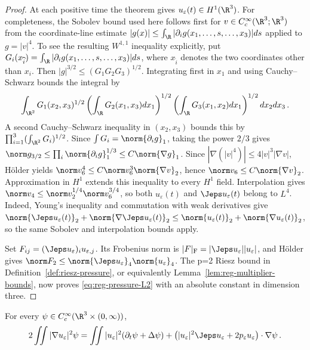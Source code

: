 \documentclass[11pt,reqno]{amsart}
\begin{document}
\begin{proof}
At each positive time the theorem gives $u_\varepsilon(t)\in H^1(\R^3)$.
For completeness, the Sobolev bound used here follows first for
$v\in C_c^\infty(\R^3;\R^3)$ from the coordinate-line estimate
$|g(x)|\le\int_\R|\partial_i g(x_1,\ldots,s,\ldots,x_3)|ds$ applied to
$g=|v|^4$. To see the resulting $W^{1,1}$ inequality explicitly, put
$G_i(x_{\widehat i})=\int_\R|\partial_i g(x_1,\ldots,s,\ldots,x_3)|ds$,
where $x_{\widehat i}$ denotes the two coordinates other than $x_i$.
Then $|g|^{3/2}\le(G_1G_2G_3)^{1/2}$. Integrating first in $x_1$ and
using Cauchy--Schwarz bounds the integral by
\begin{equation*}
\int_{\R^2}G_1(x_2,x_3)^{1/2}
  \left(\int_\R G_2(x_1,x_3)dx_1\right)^{1/2}
  \left(\int_\R G_3(x_1,x_2)dx_1\right)^{1/2}dx_2dx_3\,.
\end{equation*}
A second Cauchy--Schwarz inequality in $(x_2,x_3)$ bounds this by
$\prod_{i=1}^3(\int_{\R^2}G_i)^{1/2}$. Since
$\int G_i=\norm{\partial_i g}_1$, taking the power $2/3$ gives
$\norm g_{3/2}\le\prod_i\norm{\partial_i g}_1^{1/3}
\le C\norm{\nabla g}_1$. Since
$|\nabla(|v|^4)|\le4|v|^3|\nabla v|$, Hölder yields
$\norm v_6^4\le C\norm v_6^3\norm{\nabla v}_2$, hence
$\norm v_6\le C\norm{\nabla v}_2$. Approximation in $H^1$ extends this
inequality to every $H^1$ field. Interpolation gives
$\norm v_4\le\norm v_2^{1/4}\norm v_6^{3/4}$, so both $u_\varepsilon(t)$
and $\Jeps u_\varepsilon(t)$ belong to $L^4$. Indeed, Young's inequality
and commutation with weak derivatives give
$\norm{\Jeps u_\varepsilon(t)}_2+
\norm{\nabla\Jeps u_\varepsilon(t)}_2
\le\norm{u_\varepsilon(t)}_2+\norm{\nabla u_\varepsilon(t)}_2$,
so the same Sobolev and interpolation bounds apply.

Set $F_{ij}=(\Jeps u_\varepsilon)_i u_{\varepsilon,j}$. Its Frobenius
norm is $|F|_{\mathrm F}=|\Jeps u_\varepsilon||u_\varepsilon|$, and
Hölder gives $\norm F_2\le\norm{\Jeps u_\varepsilon}_4
\norm{u_\varepsilon}_4$. The p=2 Riesz bound in
Definition~\ref{def:riesz-pressure}, or equivalently
Lemma~\ref{lem:reg-multiplier-bounds}, now proves
\eqref{eq:reg-pressure-L2} with an absolute constant in dimension three.
\end{proof}

\begin{lemma}\label{lem:reg-local-energy}
For every $\psi\in C_c^\infty(\R^3\times(0,\infty))$,
\begin{equation}\label{eq:reg-local-energy}
  2\iint |\nabla u_\varepsilon|^2\psi
  =\iint |u_\varepsilon|^2(\partial_t\psi+\Delta\psi)
   +\bigl(|u_\varepsilon|^2\Jeps u_\varepsilon
        +2p_\varepsilon u_\varepsilon\bigr)\cdot\nabla\psi\,.
\end{equation}
\end{lemma}
\end{document}
